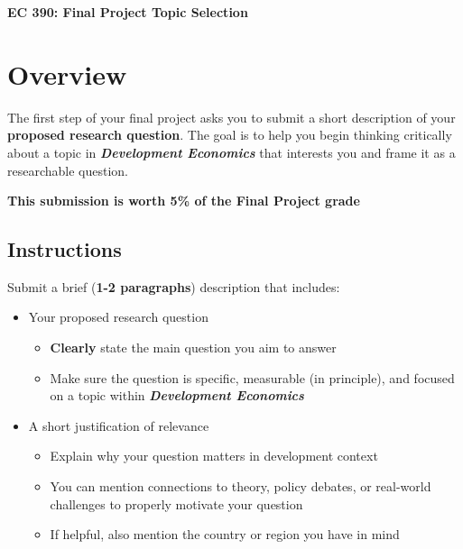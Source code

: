 \documentclass[11pt]{article}
\begin{document}
\thispagestyle{fancy}
\selectfont

\begin{center}
\textbf{\huge EC 390: Final Project Topic Selection}\\  
\end{center}

\section*{Overview}
The first step of your final project asks you to submit a short description of your \textbf{proposed research question}.
The goal is to help you begin thinking critically about a topic in \emph{\textbf{Development Economics}} that interests you and frame it as a researchable question.

\textbf{This submission is worth 5\% of the Final Project grade}

\subsection*{Instructions}
Submit a brief (\textbf{1-2 paragraphs}) description that includes:

\begin{itemize}
    \item[\faCheckSquareO] Your proposed research question
        \begin{itemize}
            \item[\faFolderOpenO] \textbf{Clearly} state the main question you aim to answer 
            \item[\faFolderOpenO] Make sure the question is specific, measurable (in principle), and focused on a topic within \emph{\textbf{Development Economics}}
        \end{itemize}
    \item[\faCheckSquareO] A short justification of relevance
        \begin{itemize}
            \item[\faFolderOpenO] Explain why your question matters in development context
            \item[\faFolderOpenO] You can mention connections to theory, policy debates, or real-world challenges to properly motivate your question
            \item[\faFolderOpenO] If helpful, also mention the country or region you have in mind 
        \end{itemize}
\end{itemize}
\end{document}
